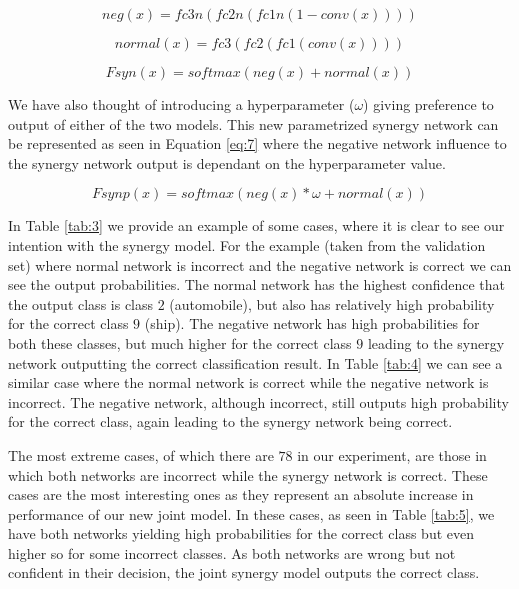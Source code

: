 \documentclass[b5paper]{book}
\begin{document}
\begin{equation}\label{eq:4}
neg(x) = fc3n(fc2n(fc1n(1 - conv(x))))
\end{equation}

\begin{equation}\label{eq:5}
normal(x) = fc3(fc2(fc1(conv(x))))
\end{equation}

\begin{equation}\label{eq:6}
Fsyn(x) = softmax(neg(x) + normal(x))
\end{equation}

We have also thought of introducing a hyperparameter (\(\omega\)) giving preference to output of either of the two models. This new parametrized synergy network can be represented as seen in Equation \ref{eq:7} where the negative network influence to the synergy network output is dependant on the hyperparameter value.

\begin{equation}\label{eq:7}
Fsynp(x) = softmax(neg(x) * \omega + normal(x))
\end{equation}

In Table \ref{tab:3} we provide an example of some cases, where it is clear to see our intention with the synergy model. For the example (taken from the validation set) where normal network is incorrect and the negative network is correct we can see the output probabilities. The normal network has the highest confidence that the output class is class \(2\) (automobile), but also has relatively high probability for the correct class \(9\) (ship). The negative network has high probabilities for both these classes, but much higher for the correct class \(9\) leading to the synergy network outputting the correct classification result. In Table \ref{tab:4} we can see a similar case where the normal network is correct while the negative network is incorrect. The negative network, although incorrect, still outputs high probability for the correct class, again leading to the synergy network being correct.

The most extreme cases, of which there are \( 78 \) in our experiment, are those in which both networks are incorrect while the synergy network is correct. These cases are the most interesting ones as they represent an absolute increase in performance of our new joint model. In these cases, as seen in Table \ref{tab:5}, we have both networks yielding high probabilities for the correct class but even higher so for some incorrect classes. As both networks are wrong but not confident in their decision, the joint synergy model outputs the correct class.
\end{document}
